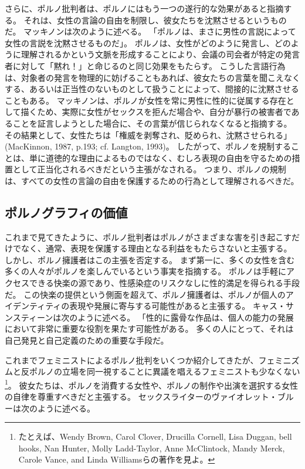 \documentclass[paper=a4,book,openany]{jlreq}
\begin{document}
さらに、ポルノ批判者は、ポルノにはもう一つの遂行的な効果があると指摘する。
それは、女性の言論の自由を制限し、彼女たちを沈黙させるというものだ。
マッキノンは次のように述べる。
「ポルノは、まさに男性の言説によって女性の言説を沈黙させるものだ」\citep[pp.209--209]{mackinnon87:_femin_unmod}。
ポルノは、女性がどのように発言し、どのように理解されるかという文脈を形成することにより、会議の司会者が特定の発言者に対して「黙れ！」と命じるのと同じ効果をもたらす。
こうした言語行為は、対象者の発言を物理的に妨げることもあれば、彼女たちの言葉を聞こえなくする、あるいは正当性のないものとして扱うことによって、間接的に沈黙させることもある。
マッキノンは、ポルノが女性を常に男性に性的に従属する存在として描くため、実際に女性がセックスを拒んだ場合や、自分が暴行の被害者であることを証言しようとした場合に、その言葉が信じられなくなると指摘する。
その結果として、女性たちは「権威を剥奪され、貶められ、沈黙させられる」(MacKinnon, 1987, p.193; cf. Langton, 1993)\nocite{langton93:_speec_acts_and_unspeak_acts}。
したがって、ポルノを規制することは、単に道徳的な理由によるものではなく、むしろ表現の自由を守るための措置として正当化されるべきだという主張がなされる。
つまり、ポルノの規制は、すべての女性の言論の自由を保護するための行為として理解されるべきだ。

\subsection{ポルノグラフィの価値}

これまで見てきたように、ポルノ批判者はポルノがさまざまな害を引き起こすだけでなく、通常、表現を保護する理由となる利益をもたらさないと主張する。
しかし、ポルノ擁護者はこの主張を否定する。
まず第一に、多くの女性を含む多くの人々がポルノを楽しんでいるという事実を指摘する。
ポルノは手軽にアクセスできる快楽の源であり、性感染症のリスクなしに性的満足を得られる手段だ。
この快楽の提供という側面を超えて、ポルノ擁護者は、ポルノが個人のアイデンティティの表現や発展に寄与する可能性があると主張する。
キャス・サンスティーンは次のように述べる。
「性的に露骨な作品は、個人の能力の発展において非常に重要な役割を果たす可能性がある。
多くの人にとって、それは自己発見と自己定義のための重要な手段だ\citep[p.215]{sunstein95:_democ_probl_free_speec}。

これまでフェミニストによるポルノ批判をいくつか紹介してきたが、フェミニズムと反ポルノの立場を同一視することに異議を唱えるフェミニストも少なくない
\footnote{たとえば、Wendy Brown, Carol Clover, Drucilla Cornell, Lisa Duggan, bell hooks, Nan Hunter, Molly Ladd-Taylor, Anne McClintock, Mandy Merck, Carole Vance, and Linda Williamsらの著作を見よ。
}。
彼女たちは、ポルノを消費する女性や、ポルノの制作や出演を選択する女性の自律を尊重すべきだと主張する。
セックスライターのヴァイオレット・ブルーは次のように述べる。
\end{document}
